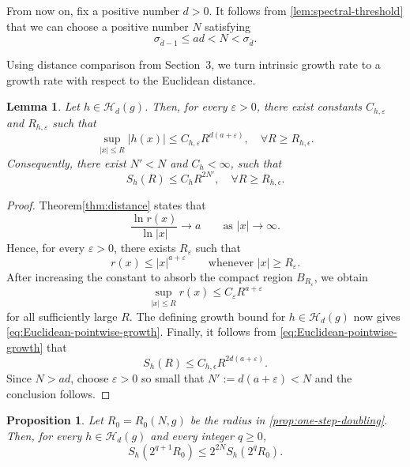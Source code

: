 \documentclass[12pt]{amsart}
\theoremstyle{plain}
\newtheorem{proposition}[theorem]{Proposition}
\newtheorem{lemma}[theorem]{Lemma}
\theoremstyle{definition}
\theoremstyle{remark}     %
\numberwithin{equation}{section}
\begin{document}
From now on, fix a positive number $d>0$. It follows from \cref{lem:spectral-threshold} that we can  choose a positive number $N$ satisfying
\begin{equation}\label{eq:choice-of-N}
   \sigma_{\bar{d}-1}\leq ad<N<\sigma_{\bar{d}}.
\end{equation}


Using distance comparison from Section~3, we turn intrinsic growth rate to a growth rate with respect to the Euclidean distance.
\begin{lemma}
\label{lem:intrinsic-to-Euclidean-growth}
Let $h\in\mathcal H_d(g)$. Then, for every $\varepsilon>0$, there exist constants
$C_{h,\varepsilon}$ and $R_{h,\varepsilon}$ such that
\begin{equation}\label{eq:Euclidean-pointwise-growth}
    \sup_{|x|\leq R}|h(x)|
    \leq C_{h,\varepsilon}R^{d(a+\varepsilon)},
    \quad \forall R\geq R_{h,\epsilon}.
\end{equation}
Consequently, there exist $N'<N$ and $C_h<\infty$, such that
\[
    S_h(R)
    \leq C_{h}R^{2N'},\quad\forall R\geq R_{h,\epsilon}.
\]
\end{lemma}

\begin{proof}
Theorem\ref{thm:distance} states that
\[
    \frac{\ln r(x)}{\ln|x|}\to a
    \qquad\text{as }|x|\to\infty.
\]
Hence, for every $\varepsilon>0$, there exists $R_\varepsilon$ such that
\[
    r(x)\leq |x|^{a+\varepsilon}
    \qquad\text{whenever }|x|\geq R_\varepsilon.
\]
After increasing the constant to absorb the compact region
$B_{R_\varepsilon}$, we obtain
\[
    \sup_{|x|\leq R} r(x)
    \leq C_\varepsilon R^{a+\varepsilon}
\]
for all sufficiently large $R$.  The defining growth bound for
$h\in\mathcal H_d(g)$ now gives \cref{eq:Euclidean-pointwise-growth}.
Finally, it follows  from \cref{eq:Euclidean-pointwise-growth} that
\[
    S_h(R)\leq C_{h,\epsilon}R^{2d(a+\varepsilon)}.
\]
Since $N>ad$, choose $\varepsilon>0$ so small that $N':=d(a+\varepsilon)<N$ and the conclusion follows.
\end{proof}

\begin{proposition}
\label{prop:uniform-dyadic-doubling}
Let $R_0=R_0(N,g)$ be the radius in
\cref{prop:one-step-doubling}.  Then, for every
$h\in\mathcal H_d(g)$ and every integer $q\geq0$,
\begin{equation}\label{eq:uniform-dyadic-doubling}
    S_h(2^{q+1}R_0)
    \leq2^{2N}S_h(2^qR_0).
\end{equation}
\end{proposition}
\end{document}
